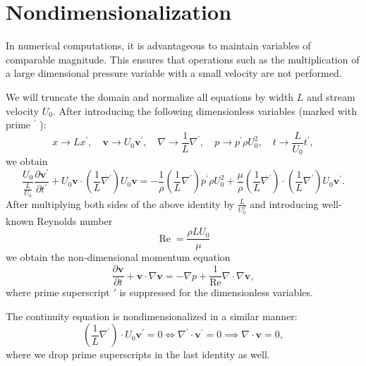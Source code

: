 \documentclass{article}
\numberwithin{equation}{section}
\begin{document}
\section{Nondimensionalization}\label{sec:nondimensionalization}
In numerical computations, it is advantageous to maintain variables of comparable magnitude. This ensures that operations such as the multiplication of a large dimensional pressure variable with a small velocity are not performed. 

We will truncate the domain and normalize all equations by width $L$ and stream velocity $U_0$. After introducing the following dimensionless variables (marked with prime ${ }^{\prime}$ ):
\begin{equation*}
	x\to Lx^{\prime},  \quad 
	\boldsymbol{v}\to U_0\boldsymbol{v}^{\prime}, \quad 
	\nabla\to \frac{1}{L}\nabla^{\prime}, \quad 
	p\to p^{\prime} \rho U_0^2, \quad 
	t\to \frac{L}{U_0}t^{\prime},
\end{equation*}
we obtain
\begin{equation*}
	\frac{U_0}{\frac{L}{U_0}} \frac{\partial \boldsymbol{v}^{\prime}}{\partial t^{\prime}}+U_0\boldsymbol{v}\cdot\left(\frac{1}{L} \nabla^{\prime}\right) U_0\boldsymbol{v}=-\frac{1}{\rho}\left(\frac{1}{L} \nabla^{\prime}\right){p^{\prime}\rho U^2_0}+\frac{\mu}{\rho} \left(\frac{1}{L} \nabla^{\prime}\right) \cdot\left(\frac{1}{L} \nabla^{\prime}\right) U_0\boldsymbol{v}^{\prime}.
\end{equation*}
After multiplying both sides of the above identity by $\frac{L}{U_0^2}$ and introducing well-known Reynolds number 
\begin{equation*}
\operatorname{Re}=\frac{\rho L U_0}{\mu}
\end{equation*}
we obtain the non-dimensional momentum equation
\begin{equation*}
	\frac{\partial \boldsymbol{v}}{\partial t} + \boldsymbol{v} \cdot \nabla \boldsymbol{v} = -\nabla p + \frac{1}{\operatorname{Re}} \nabla \cdot \nabla \boldsymbol{v},
\end{equation*}
where prime superscript $\prime$ is suppressed for the dimensionless variables. 

The continuity equation is nondimensionalized in a similar manner:
\begin{equation*}
	\left(\frac{1}{L} \nabla^{\prime}\right) \cdot U_0\boldsymbol{v}^{\prime}=0\iff\nabla^{\prime} \cdot\boldsymbol{v}^{\prime}=0\implies\nabla \cdot\boldsymbol{v}=0,
\end{equation*}
where we drop prime superscripts in the last identity as well.
\end{document}
